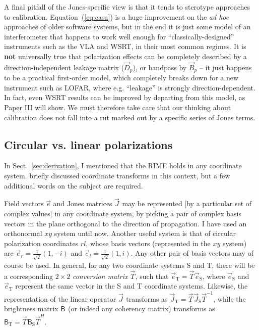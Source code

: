 \documentclass[referee]{aa}
\newcommand{\herm}{H}
\newcommand{\jones}[2]{\vec {#1}_{#2}}
\newcommand{\jonesinv}[2]{\vec {#1}^{-1}_{#2}}
\newcommand{\jonesT}[2]{\vec {#1}^{\herm}_{#2}}
\newcommand{\coh}[2]{\mathsf{{#1}}_{{#2}}}
\begin{document}
A final pitfall of the Jones-specific view is that it tends to sterotype approaches to calibration. Equation~(\ref{eq:casa}) is a huge improvement on the \emph{ad hoc} approaches of older software systems, but in the end it is just some model of an interferometer that happens to work well enough for ``classically-designed'' instruments such as the VLA and WSRT, in their most common regimes. It is {\bf not} universally true that polarization effects can be completely described by a direction-independent leakage matrix ($\jones{D}{p}$), or bandpass by $\jones{B}{p}$ -- it just happens to be a practical first-order model, which completely breaks down for a new instrument such as LOFAR, where e.g. ``leakage'' is strongly direction-dependent. In fact, even WSRT results can be improved by departing from this model, as Paper III will show. We must therefore take care that our thinking about calibration does not fall into a rut marked out by a specific series of Jones terms.

\subsection{\label{sec:circular}Circular vs. linear polarizations}

In Sect.~\ref{sec:derivation}, I mentioned that the RIME holds in any coordinate system. \citet{ME1} briefly 
discussed coordinate transforms in this context, but a few additional words on the subject are required.

Field vectors $\vec e$ and Jones matrices $\jones{J}{}$ may be represented [by a particular set of complex values] in any coordinate system, by picking a pair of complex basis vectors in the plane orthogonal to the direction of propagation. I have used an orthonormal $xy$ system until now. Another useful system is that of circular polarization coordinates $rl$, whose basis vectors (represented in the $xy$ system) are $\vec e_r=\frac{1}{\sqrt{2}}(1,-i)$ and $\vec e_l=\frac{1}{\sqrt{2}}(1,i)$. Any other pair of basis vectors may of course be used. In general, for any two coordinate systems S and T, there will be a corresponding $2\times2$ {\em conversion matrix} $\jones{T}{}$, such that $\vec e_\mathrm{T}=\jones{T}{} \vec e_\mathrm{S}$, where $\vec e_\mathrm{S}$ and $\vec e_\mathrm{T}$ represent the same vector in the S and T coordinate systems. Likewise, the representation of the linear operator $\jones{J}{}$ transforms as $\jones{J}{\mathrm{T}}=\jones{T}{} \jones{J}{\mathrm{S}} \jonesinv{T}{}$, while the brightness matrix $\coh{B}{}$ (or indeed any coherency matrix) transforms as $\coh{B}{\mathrm{T}}=\jones{T}{} \coh{B}{\mathrm{S}} \jonesT{T}{}.$
\end{document}
